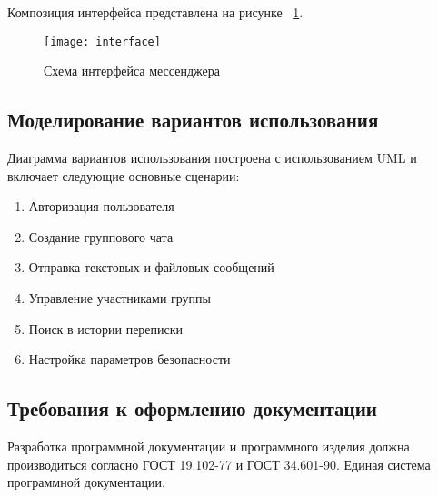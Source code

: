 Композиция интерфейса представлена на рисунке ~\ref{fig:interface}.

\begin{figure}[ht]
	\texttt{[image: interface]}
	\caption{Схема интерфейса мессенджера}
	\label{fig:interface}
\end{figure}

\subsection{Моделирование вариантов использования}

Диаграмма вариантов использования построена с использованием UML и включает следующие основные сценарии:
\begin{enumerate}
	\item Авторизация пользователя
	\item Создание группового чата
	\item Отправка текстовых и файловых сообщений
	\item Управление участниками группы
	\item Поиск в истории переписки
	\item Настройка параметров безопасности
\end{enumerate}

\subsection{Требования к оформлению документации}

Разработка программной документации и программного изделия должна производиться согласно ГОСТ 19.102-77 и ГОСТ 34.601-90. Единая система программной документации.